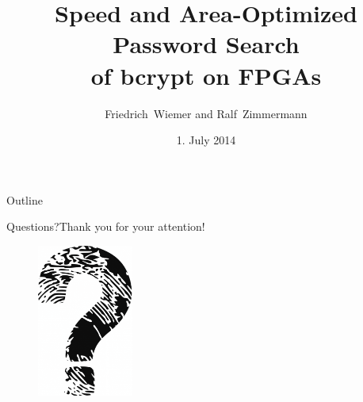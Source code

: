 \documentclass[12pt]{beamer}
\title{Speed and Area-Optimized Password Search\\ of bcrypt on FPGAs}
\subtitle{}
\author{Friedrich~Wiemer and Ralf~Zimmermann}
\institute[Ruhr University Bochum]
{%
  Chair for Embedded Security\\
  Ruhr University Bochum
}
\date{1. July 2014}
\begin{document}
\begin{frame}
    \titlepage{}
\end{frame}

\begin{frame}{Outline}
  \tableofcontents
\end{frame}



\begin{frame}{Questions?}{Thank you for your attention!}
    \begin{figure}[!htb]
        \includegraphics[height=50mm]{data/questions.png}
    \end{figure}
\end{frame}
\end{document}
